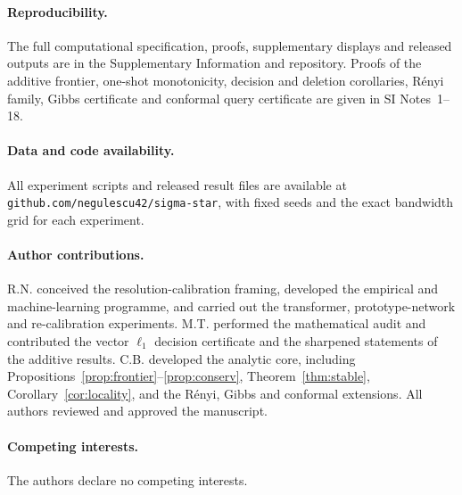 \documentclass[10pt,twocolumn]{article}
\begin{document}
\paragraph{Reproducibility.} The full computational specification, proofs, supplementary displays and released outputs are in the Supplementary Information and repository. Proofs of the additive frontier, one-shot monotonicity, decision and deletion corollaries, R\'enyi family, Gibbs certificate and conformal query certificate are given in SI Notes~1--18.

\paragraph{Data and code availability.} All experiment scripts and released result files are available at \texttt{github.com/negulescu42/sigma-star}, with fixed seeds and the exact bandwidth grid for each experiment.

\paragraph{Author contributions.} R.N. conceived the resolution-calibration framing, developed the empirical and machine-learning programme, and carried out the transformer, prototype-network and re-calibration experiments. M.T. performed the mathematical audit and contributed the vector $\ell_1$ decision certificate and the sharpened statements of the additive results. C.B. developed the analytic core, including Propositions~\ref{prop:frontier}--\ref{prop:conserv}, Theorem~\ref{thm:stable}, Corollary~\ref{cor:locality}, and the R\'enyi, Gibbs and conformal extensions. All authors reviewed and approved the manuscript. \paragraph{Competing interests.} The authors declare no competing interests.
\end{document}
